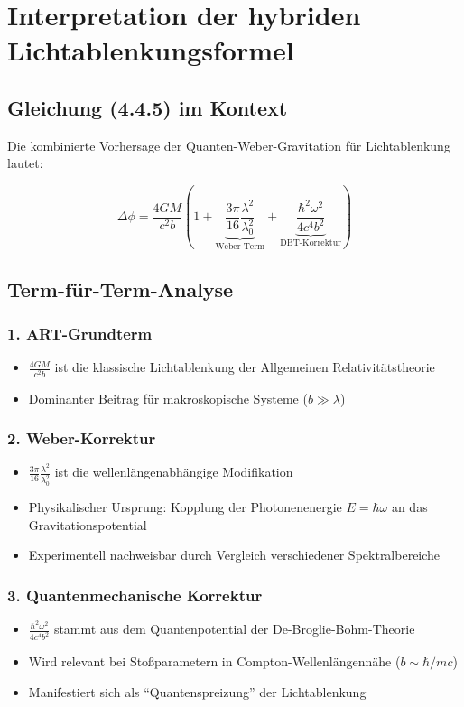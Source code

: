 \section{Interpretation der hybriden Lichtablenkungsformel}
\label{sec:hybrid_light_deflection}

\subsection{Gleichung (4.4.5) im Kontext}
Die kombinierte Vorhersage der Quanten-Weber-Gravitation für Lichtablenkung lautet:

\begin{equation}
\Delta\phi = \frac{4GM}{c^2b}\left(1 + \underbrace{\frac{3\pi}{16}\frac{\lambda^2}{\lambda_0^2}}_{\text{Weber-Term}} + \underbrace{\frac{\hbar^2\omega^2}{4c^4b^2}}_{\text{DBT-Korrektur}}\right)
\tag{4.4.5}
\end{equation}

\subsection{Term-für-Term-Analyse}

\subsubsection{1. ART-Grundterm}
\begin{itemize}
\item $\frac{4GM}{c^2b}$ ist die klassische Lichtablenkung der Allgemeinen Relativitätstheorie
\item Dominanter Beitrag für makroskopische Systeme ($b \gg \lambda$)
\end{itemize}

\subsubsection{2. Weber-Korrektur}
\begin{itemize}
\item $\frac{3\pi}{16}\frac{\lambda^2}{\lambda_0^2}$ ist die wellenlängenabhängige Modifikation
\item Physikalischer Ursprung: Kopplung der Photonenenergie $E=\hbar\omega$ an das Gravitationspotential
\item Experimentell nachweisbar durch Vergleich verschiedener Spektralbereiche
\end{itemize}

\subsubsection{3. Quantenmechanische Korrektur}
\begin{itemize}
\item $\frac{\hbar^2\omega^2}{4c^4b^2}$ stammt aus dem Quantenpotential der De-Broglie-Bohm-Theorie
\item Wird relevant bei Stoßparametern in Compton-Wellenlängennähe ($b \sim \hbar/mc$)
\item Manifestiert sich als \enquote{Quantenspreizung} der Lichtablenkung
\end{itemize}

